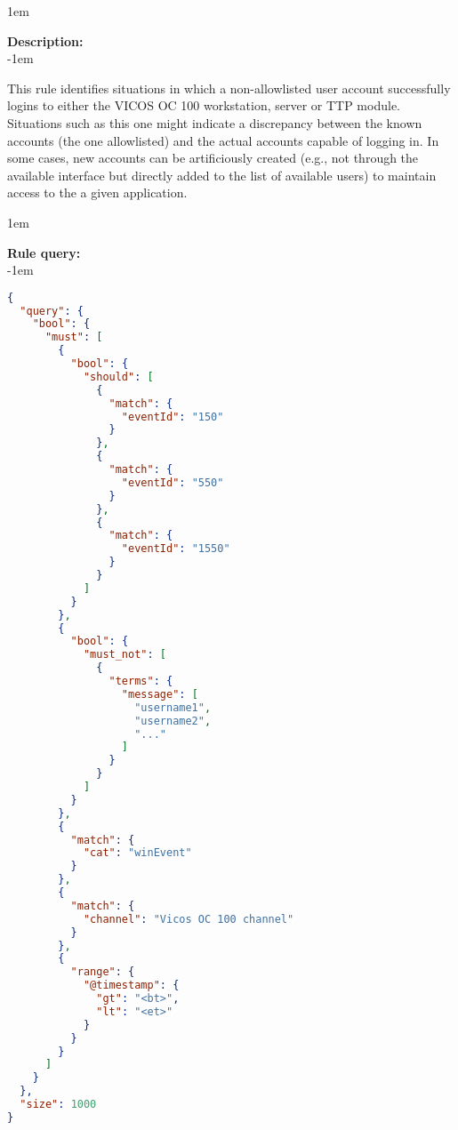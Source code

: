 \openup 1em

{\bf Description:} \\

\openup -1em
\vspace{-2em}


This rule identifies situations in which a non-allowlisted user account successfully logins to either the VICOS OC 100 workstation, server or TTP module. Situations such as this one might indicate a discrepancy between the known accounts (the one allowlisted) and the actual accounts capable of logging in. In some cases, new accounts can be artificiously created (e.g., not through the available interface but directly added to the list of available users) to maintain access to the a given application.

\openup 1em

{\bf Rule query:} \\

\openup -1em
\vspace{-2em}

\begin{lstlisting}[language=json,firstnumber=1]
{
  "query": {
    "bool": {
      "must": [
        {
          "bool": {
            "should": [
              {
                "match": {
                  "eventId": "150"
                }
              },
              {
                "match": {
                  "eventId": "550"
                }
              },
              {
                "match": {
                  "eventId": "1550"
                }
              }
            ]
          }
        },
        {
          "bool": {
            "must_not": [
              {
                "terms": {
                  "message": [
                    "username1",
                    "username2",
                    "..."
                  ]
                }
              }
            ]
          }
        },
        {
          "match": {
            "cat": "winEvent"
          }
        },
        {
          "match": {
            "channel": "Vicos OC 100 channel"
          }
        },
        {
          "range": {
            "@timestamp": {
              "gt": "<bt>",
              "lt": "<et>"
            }
          }
        }
      ]
    }
  },
  "size": 1000
}
\end{lstlisting}

